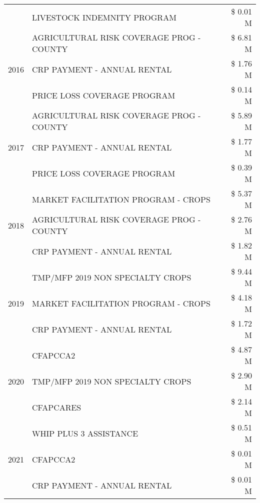 \begin{tabular}{llr}
 & LIVESTOCK INDEMNITY PROGRAM & \$ 0.01 M \\
\cline{1-3}
\multirow[t]{3}{*}{2016} & AGRICULTURAL RISK COVERAGE PROG - COUNTY & \$ 6.81 M \\
 & CRP PAYMENT - ANNUAL RENTAL & \$ 1.76 M \\
 & PRICE LOSS COVERAGE PROGRAM & \$ 0.14 M \\
\cline{1-3}
\multirow[t]{3}{*}{2017} & AGRICULTURAL RISK COVERAGE PROG - COUNTY & \$ 5.89 M \\
 & CRP PAYMENT - ANNUAL RENTAL & \$ 1.77 M \\
 & PRICE LOSS COVERAGE PROGRAM & \$ 0.39 M \\
\cline{1-3}
\multirow[t]{3}{*}{2018} & MARKET FACILITATION PROGRAM - CROPS & \$ 5.37 M \\
 & AGRICULTURAL RISK COVERAGE PROG - COUNTY & \$ 2.76 M \\
 & CRP PAYMENT - ANNUAL RENTAL & \$ 1.82 M \\
\cline{1-3}
\multirow[t]{3}{*}{2019} & TMP/MFP 2019 NON SPECIALTY CROPS & \$ 9.44 M \\
 & MARKET FACILITATION PROGRAM - CROPS & \$ 4.18 M \\
 & CRP PAYMENT - ANNUAL RENTAL & \$ 1.72 M \\
\cline{1-3}
\multirow[t]{3}{*}{2020} & CFAPCCA2 & \$ 4.87 M \\
 & TMP/MFP 2019 NON SPECIALTY CROPS & \$ 2.90 M \\
 & CFAPCARES & \$ 2.14 M \\
\cline{1-3}
\multirow[t]{3}{*}{2021} & WHIP PLUS 3 ASSISTANCE & \$ 0.51 M \\
 & CFAPCCA2 & \$ 0.01 M \\
 & CRP PAYMENT - ANNUAL RENTAL & \$ 0.01 M \\
\cline{1-3}
\bottomrule
\end{tabular}

